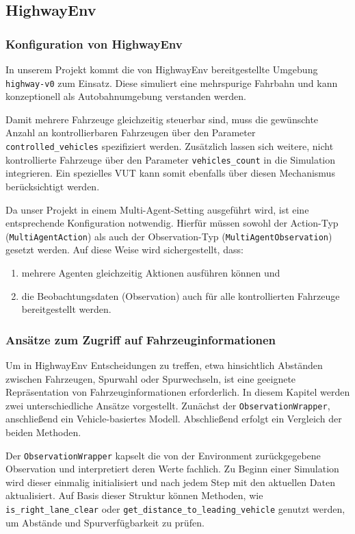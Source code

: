 \subsection{HighwayEnv}
\subsubsection{Konfiguration von HighwayEnv}
In unserem Projekt kommt die von HighwayEnv bereitgestellte Umgebung \texttt{highway-v0} zum Einsatz. Diese simuliert eine mehrspurige Fahrbahn und kann konzeptionell als Autobahnumgebung verstanden werden. 

Damit mehrere Fahrzeuge gleichzeitig steuerbar sind, muss die gewünschte Anzahl an kontrollierbaren Fahrzeugen über den Parameter \texttt{controlled\_vehicles} spezifiziert werden. Zusätzlich lassen sich weitere, nicht kontrollierte Fahrzeuge über den Parameter \texttt{vehicles\_count} in die Simulation integrieren. Ein spezielles VUT kann somit ebenfalls über diesen Mechanismus berücksichtigt werden.

Da unser Projekt in einem Multi-Agent-Setting ausgeführt wird, ist eine entsprechende Konfiguration notwendig. Hierfür müssen sowohl der Action-Typ (\texttt{MultiAgentAction}) als auch der Observation-Typ (\texttt{MultiAgentObservation}) gesetzt werden. Auf diese Weise wird sichergestellt, dass:
\begin{enumerate}
    \item mehrere Agenten gleichzeitig Aktionen ausführen können und
    \item die Beobachtungsdaten (Observation) auch für alle kontrollierten Fahrzeuge bereitgestellt werden.
\end{enumerate}

\subsubsection{Ansätze zum Zugriff auf Fahrzeuginformationen}
\label{sec:get_vehicle_info}
Um in HighwayEnv Entscheidungen zu treffen, etwa hinsichtlich Abständen zwischen Fahrzeugen, Spurwahl oder Spurwechseln, ist eine geeignete Repräsentation von Fahrzeuginformationen erforderlich. In diesem Kapitel werden zwei unterschiedliche Ansätze vorgestellt. Zunächst der \texttt{ObservationWrapper}, anschließend ein Vehicle-basiertes Modell. Abschließend erfolgt ein Vergleich der beiden Methoden.

Der \texttt{ObservationWrapper} kapselt die von der Environment zurückgegebene Observation und interpretiert deren Werte fachlich. Zu Beginn einer Simulation wird dieser einmalig initialisiert und nach jedem Step mit den aktuellen Daten aktualisiert. Auf Basis dieser Struktur können Methoden, wie \texttt{is\_right\_lane\_clear} oder \texttt{get\_distance\_to\_leading\_vehicle} genutzt werden, um Abstände und Spurverfügbarkeit zu prüfen.

